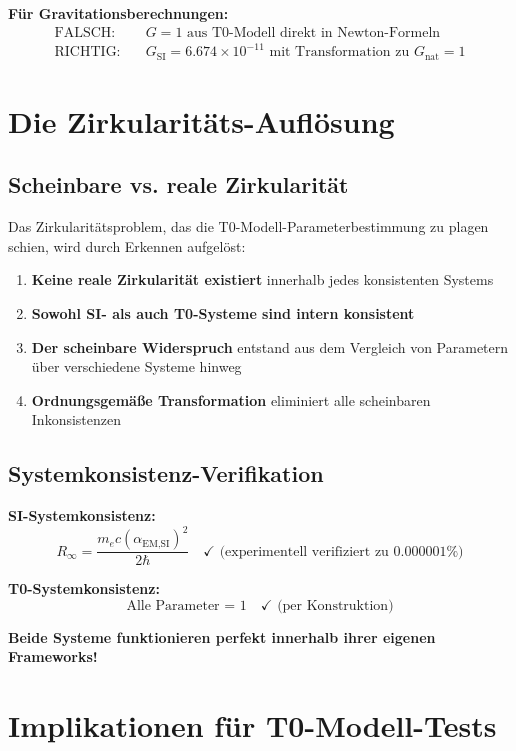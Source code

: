 \documentclass[12pt,a4paper]{article}
\newcommand{\Rzero}{R_\infty}
\newcommand{\alphaEMSI}{\alpha_{\text{EM,SI}}}
\begin{document}
	\textbf{Für Gravitationsberechnungen:}
	\begin{align}
		\text{FALSCH:} \quad &G = 1 \text{ aus T0-Modell direkt in Newton-Formeln} \\
		\text{RICHTIG:} \quad &G_{\text{SI}} = 6.674 \times 10^{-11} \text{ mit Transformation zu } G_{\text{nat}} = 1
	\end{align}
	
	\section{Die Zirkularitäts-Auflösung}
	\label{sec:zirkularitaets_aufloesung}
	
	\subsection{Scheinbare vs. reale Zirkularität}
	\label{subsec:scheinbare_reale_zirkularitaet}
	
	Das Zirkularitätsproblem, das die T0-Modell-Parameterbestimmung zu plagen schien, wird durch Erkennen aufgelöst:
	
	\begin{enumerate}
		\item \textbf{Keine reale Zirkularität existiert} innerhalb jedes konsistenten Systems
		\item \textbf{Sowohl SI- als auch T0-Systeme sind intern konsistent}
		\item \textbf{Der scheinbare Widerspruch} entstand aus dem Vergleich von Parametern über verschiedene Systeme hinweg
		\item \textbf{Ordnungsgemäße Transformation} eliminiert alle scheinbaren Inkonsistenzen
	\end{enumerate}
	
	\subsection{Systemkonsistenz-Verifikation}
	\label{subsec:systemkonsistenz}
	
	\textbf{SI-Systemkonsistenz:}
	$$\Rzero = \frac{m_e c \left(\alphaEMSI\right)^2}{2\hbar} \quad \checkmark \text{ (experimentell verifiziert zu 0.000001\%)}$$
	
	\textbf{T0-Systemkonsistenz:}
	$$\text{Alle Parameter = 1} \quad \checkmark \text{ (per Konstruktion)}$$
	
	\textbf{Beide Systeme funktionieren perfekt innerhalb ihrer eigenen Frameworks!}
	
	\section{Implikationen für T0-Modell-Tests}
	\label{sec:test_implikationen}
	
\end{document}
